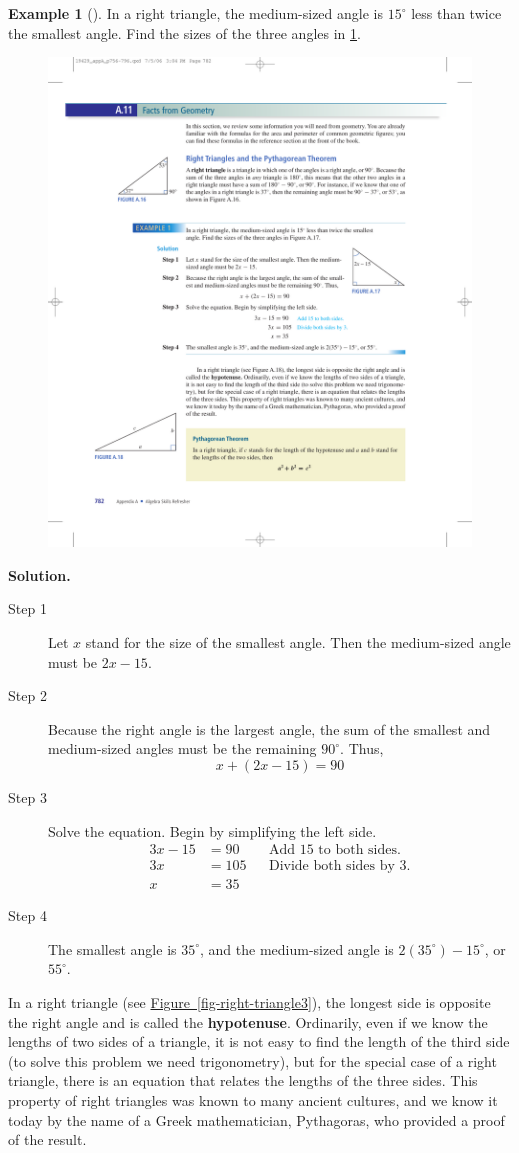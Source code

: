 \documentclass[10pt,]{book}
\newcommand{\terminology}[1]{\textbf{#1}}
\theoremstyle{plain}
\theoremstyle{definition}
\theoremstyle{definition}
\newtheorem{example}[theorem]{Example}
\theoremstyle{definition}
\numberwithin{equation}{part}
\newcommand\degree[0]{^{\circ}}
\newcommand{\amp}{&}
\begin{document}
\begin{example}[]\label{example-80}
In a right triangle, the medium-sized angle is \(15\degree\) less than twice the smallest angle. Find the sizes of the three angles in \hyperref[fig-right-triangle2]{\ref{fig-right-triangle2}}. \leavevmode%
\begin{figure}
\centering
\includegraphics[width=0.3\linewidth]{images/fig-right-triangle2}
\caption{\label{fig-right-triangle2}}
\end{figure}
%
\par\medskip\noindent%
\textbf{Solution.}\quad \leavevmode%
\begin{description}
\item[{Step 1}]\hypertarget{li-362}{}Let \(x\) stand for the size of the smallest angle. Then the medium-sized angle must be \(2x-15\).%
\item[{Step 2}]\hypertarget{li-363}{}Because the right angle is the largest angle, the sum of the smallest and medium-sized angles must be the remaining \(90\degree\). Thus,%
\begin{equation*}
x + (2x − 15) = 90
\end{equation*}
%
\item[{Step 3}]\hypertarget{li-364}{}Solve the equation. Begin by simplifying the left side.%
\begin{align*}
3x − 15 \amp = 90\amp\amp\text{Add 15 to both sides.} \\
3x \amp = 105\amp\amp\text{Divide both sides by 3.}\\
x \amp = 35
\end{align*}
%
\item[{Step 4}]\hypertarget{li-365}{}The smallest angle is \(35\degree\), and the medium-sized angle is \(2(35\degree) −15\degree\), or \(55\degree\).%
\end{description}
%
\end{example}
\par
In a right triangle (see \hyperref[fig-right-triangle3]{Figure~\ref{fig-right-triangle3}}), the longest side is opposite the right angle and is called the \terminology{hypotenuse}. Ordinarily, even if we know the lengths of two sides of a triangle, it is not easy to find the length of the third side (to solve this problem we need trigonometry), but for the special case of a right triangle, there is an equation that relates the lengths of the three sides. This property of right triangles was known to many ancient cultures, and we know it today by the name of a Greek mathematician, Pythagoras, who provided a proof of the result. \leavevmode%
\end{document}

